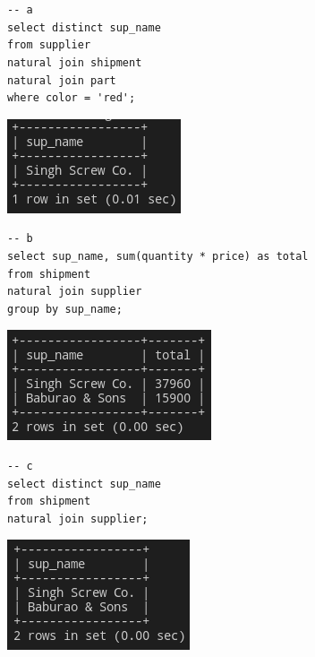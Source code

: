 \documentclass{article}
\begin{document}
\section{}
\begin{lstlisting}
-- a
select distinct sup_name 
from supplier
natural join shipment
natural join part
where color = 'red';
\end{lstlisting}
\begin{center}
    \includegraphics[scale=0.6]{5a.png}
\end{center}

\begin{lstlisting}
-- b
select sup_name, sum(quantity * price) as total
from shipment
natural join supplier
group by sup_name;
\end{lstlisting}
\begin{center}
    \includegraphics[scale=0.6]{5b.png}
\end{center}

\begin{lstlisting}
-- c
select distinct sup_name 
from shipment
natural join supplier;
\end{lstlisting}
\begin{center}
    \includegraphics[scale=0.6]{5c.png}
\end{center}
\end{document}
